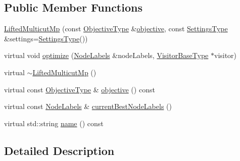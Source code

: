 \subsection*{Public Member Functions}
\begin{DoxyCompactItemize}
\item 
\hyperlink{classnifty_1_1graph_1_1opt_1_1lifted__multicut_1_1LiftedMulticutMp_adca237320fdfa68a56960fbe01bd6000}{Lifted\+Multicut\+Mp} (const \hyperlink{classnifty_1_1graph_1_1opt_1_1lifted__multicut_1_1LiftedMulticutMp_a7946ba353b86ff043eff57fd75513b81}{Objective\+Type} \&\hyperlink{classnifty_1_1graph_1_1opt_1_1lifted__multicut_1_1LiftedMulticutMp_af2324c385248f1400e25c90adb80a7b5}{objective}, const \hyperlink{structnifty_1_1graph_1_1opt_1_1lifted__multicut_1_1LiftedMulticutMp_1_1SettingsType}{Settings\+Type} \&settings=\hyperlink{structnifty_1_1graph_1_1opt_1_1lifted__multicut_1_1LiftedMulticutMp_1_1SettingsType}{Settings\+Type}())
\item 
virtual void \hyperlink{classnifty_1_1graph_1_1opt_1_1lifted__multicut_1_1LiftedMulticutMp_a8892a52bab4dcae8f1926081fa627488}{optimize} (\hyperlink{classnifty_1_1graph_1_1opt_1_1lifted__multicut_1_1LiftedMulticutMp_a98651524f908efa229d69761f4fa5491}{Node\+Labels} \&node\+Labels, \hyperlink{classnifty_1_1graph_1_1opt_1_1lifted__multicut_1_1LiftedMulticutMp_a8169f3c3105c3179ae7a2881502826bd}{Visitor\+Base\+Type} $\ast$visitor)
\item 
virtual \hyperlink{classnifty_1_1graph_1_1opt_1_1lifted__multicut_1_1LiftedMulticutMp_a9870ccd84f056f6790b1ab3a52ae9587}{$\sim$\+Lifted\+Multicut\+Mp} ()
\item 
virtual const \hyperlink{classnifty_1_1graph_1_1opt_1_1lifted__multicut_1_1LiftedMulticutMp_a7946ba353b86ff043eff57fd75513b81}{Objective\+Type} \& \hyperlink{classnifty_1_1graph_1_1opt_1_1lifted__multicut_1_1LiftedMulticutMp_af2324c385248f1400e25c90adb80a7b5}{objective} () const
\item 
virtual const \hyperlink{classnifty_1_1graph_1_1opt_1_1lifted__multicut_1_1LiftedMulticutMp_a98651524f908efa229d69761f4fa5491}{Node\+Labels} \& \hyperlink{classnifty_1_1graph_1_1opt_1_1lifted__multicut_1_1LiftedMulticutMp_a8038995b41fed867522a684985737020}{current\+Best\+Node\+Labels} ()
\item 
virtual std\+::string \hyperlink{classnifty_1_1graph_1_1opt_1_1lifted__multicut_1_1LiftedMulticutMp_a5c218aa3ae258bb4c62a1b1c25449fba}{name} () const
\end{DoxyCompactItemize}


\subsection{Detailed Description}
